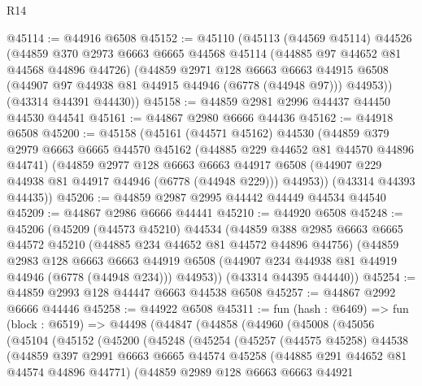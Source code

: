 \begin{lexlean}{R14}
\begin{coremodule}
@45114 := @44916 @6508
@45152 := @45110
    (@45113
      (@44569 @45114)
      @44526
      (@44859
        @370
        @2973
        @6663
        @6665
        @44568
        @45114
        (@44885 @97 @44652 @81 @44568 @44896 @44726)
        (@44859
          @2971
          @128
          @6663
          @6663
          @44915
          @6508
          (@44907 @97 @44938 @81 @44915 @44946 (@6778 (@44948 @97)))
          @44953))
      (@43314 @44391 @44430))
@45158 := @44859 @2981 @2996 @44437 @44450 @44530 @44541
@45161 := @44867 @2980 @6666 @44436
@45162 := @44918 @6508
@45200 := @45158
    (@45161
      (@44571 @45162)
      @44530
      (@44859
        @379
        @2979
        @6663
        @6665
        @44570
        @45162
        (@44885 @229 @44652 @81 @44570 @44896 @44741)
        (@44859
          @2977
          @128
          @6663
          @6663
          @44917
          @6508
          (@44907 @229 @44938 @81 @44917 @44946 (@6778 (@44948 @229)))
          @44953))
      (@43314 @44393 @44435))
@45206 := @44859 @2987 @2995 @44442 @44449 @44534 @44540
@45209 := @44867 @2986 @6666 @44441
@45210 := @44920 @6508
@45248 := @45206
    (@45209
      (@44573 @45210)
      @44534
      (@44859
        @388
        @2985
        @6663
        @6665
        @44572
        @45210
        (@44885 @234 @44652 @81 @44572 @44896 @44756)
        (@44859
          @2983
          @128
          @6663
          @6663
          @44919
          @6508
          (@44907 @234 @44938 @81 @44919 @44946 (@6778 (@44948 @234)))
          @44953))
      (@43314 @44395 @44440))
@45254 := @44859 @2993 @128 @44447 @6663 @44538 @6508
@45257 := @44867 @2992 @6666 @44446
@45258 := @44922 @6508
@45311 := fun (hash : @6469) =>
  fun (block : @6519) =>
  @44498
    (@44847
      (@44858
        (@44960
          (@45008
            (@45056
              (@45104
                (@45152
                  (@45200
                    (@45248
                      (@45254
                        (@45257
                          (@44575 @45258)
                          @44538
                          (@44859
                            @397
                            @2991
                            @6663
                            @6665
                            @44574
                            @45258
                            (@44885 @291 @44652 @81 @44574 @44896 @44771)
                            (@44859
                              @2989
                              @128
                              @6663
                              @6663
                              @44921

\end{coremodule}
\end{lexlean}
